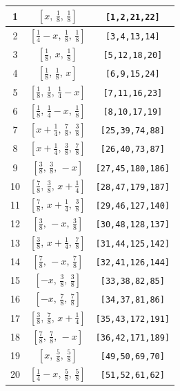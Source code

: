 \documentclass[fleqn,8pt]{jsarticle}
\begin{document}
\begin{longtable}{ccc}
1 & $\left[ x,\, \frac{1}{8},\, \frac{1}{8} \right]$ & {\tt [1,2,21,22]} \\ \hline
2 & $\left[ \frac{1}{4} - x,\, \frac{1}{8},\, \frac{1}{8} \right]$ & {\tt [3,4,13,14]} \\ \hline
3 & $\left[ \frac{1}{8},\, x,\, \frac{1}{8} \right]$ & {\tt [5,12,18,20]} \\ \hline
4 & $\left[ \frac{1}{8},\, \frac{1}{8},\, x \right]$ & {\tt [6,9,15,24]} \\ \hline
5 & $\left[ \frac{1}{8},\, \frac{1}{8},\, \frac{1}{4} - x \right]$ & {\tt [7,11,16,23]} \\ \hline
6 & $\left[ \frac{1}{8},\, \frac{1}{4} - x,\, \frac{1}{8} \right]$ & {\tt [8,10,17,19]} \\ \hline
7 & $\left[ x + \frac{1}{4},\, \frac{7}{8},\, \frac{3}{8} \right]$ & {\tt [25,39,74,88]} \\ \hline
8 & $\left[ x + \frac{1}{4},\, \frac{3}{8},\, \frac{7}{8} \right]$ & {\tt [26,40,73,87]} \\ \hline
9 & $\left[ \frac{3}{8},\, \frac{3}{8},\, - x \right]$ & {\tt [27,45,180,186]} \\ \hline
10 & $\left[ \frac{7}{8},\, \frac{3}{8},\, x + \frac{1}{4} \right]$ & {\tt [28,47,179,187]} \\ \hline
11 & $\left[ \frac{7}{8},\, x + \frac{1}{4},\, \frac{3}{8} \right]$ & {\tt [29,46,127,140]} \\ \hline
12 & $\left[ \frac{3}{8},\, - x,\, \frac{3}{8} \right]$ & {\tt [30,48,128,137]} \\ \hline
13 & $\left[ \frac{3}{8},\, x + \frac{1}{4},\, \frac{7}{8} \right]$ & {\tt [31,44,125,142]} \\ \hline
14 & $\left[ \frac{7}{8},\, - x,\, \frac{7}{8} \right]$ & {\tt [32,41,126,144]} \\ \hline
15 & $\left[ - x,\, \frac{3}{8},\, \frac{3}{8} \right]$ & {\tt [33,38,82,85]} \\ \hline
16 & $\left[ - x,\, \frac{7}{8},\, \frac{7}{8} \right]$ & {\tt [34,37,81,86]} \\ \hline
17 & $\left[ \frac{3}{8},\, \frac{7}{8},\, x + \frac{1}{4} \right]$ & {\tt [35,43,172,191]} \\ \hline
18 & $\left[ \frac{7}{8},\, \frac{7}{8},\, - x \right]$ & {\tt [36,42,171,189]} \\ \hline
19 & $\left[ x,\, \frac{5}{8},\, \frac{5}{8} \right]$ & {\tt [49,50,69,70]} \\ \hline
20 & $\left[ \frac{1}{4} - x,\, \frac{5}{8},\, \frac{5}{8} \right]$ & {\tt [51,52,61,62]} \\ \hline

\end{longtable}
\end{document}
